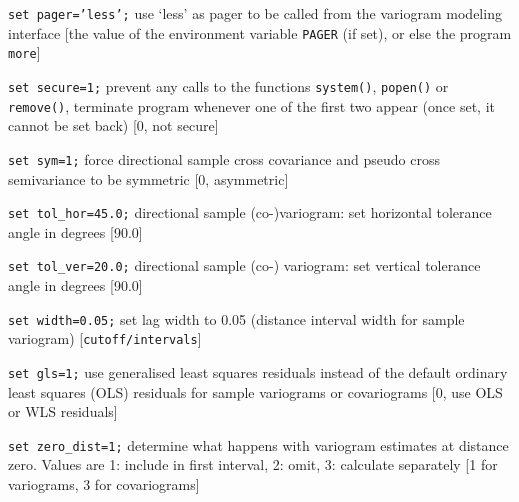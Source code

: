 \documentclass[a4paper,12pt]{book}
\makeatletter
\newcommand{\code}[1]{\texttt{#1}}
\newcommand{\thekey}[1]{\code{{#1}}\label{key:#1}\index{#1@\code{#1}}}
\newcommand{\theXkey}[2]{\code{{#1}}\label{key:#2}\index{#2@\code{#1}}}
\newenvironment{codelist}{%
\begin{description}\setlength{\labelsep}{0.5cm}}{%
\end{description}}
\makeatother
\begin{document}
\begin{codelist}

\item[\code{set \thekey{pager}='less';}]
use `less' as pager to be called from the variogram modeling interface
[the value of the environment variable {\tt PAGER} (if set), or else
the program {\tt more}]

\item[\code{set \thekey{secure}=1;}]
prevent any calls to the functions {\tt system()}, {\tt popen()} or
{\tt remove()}, terminate program whenever one of the first two appear
(once set, it cannot be set back) [0, not secure]

\item[\code{set \thekey{sym}=1;}]
force directional sample cross covariance and pseudo cross semivariance
to be symmetric [0, asymmetric]

\item[\code{set \theXkey{tol\_hor}{tolXhor}=45.0;}]
directional sample (co-)variogram: set horizontal tolerance angle in
degrees [90.0]

\item[\code{set \theXkey{tol\_ver}{tolXver}=20.0;}]
directional sample (co-) variogram: set vertical tolerance angle in
degrees [90.0]

\item[\code{set \thekey{width}=0.05;}]
\index{variogram!interval \code{width}}
set lag width to 0.05 (distance interval width for sample variogram)
[{\tt cutoff/intervals}]

\item[\code{set \thekey{gls}=1;}]
use generalised least squares residuals instead of the default ordinary
least squares (OLS) residuals for sample variograms or covariograms [0,
use OLS or WLS residuals]

\item[\code{set \theXkey{zero\_dist}{zeroXdist}=1;}]
determine what happens with variogram estimates at distance zero. Values
are 1: include in first interval, 2: omit, 3: calculate separately
[1 for variograms, 3 for covariograms]

\end{codelist}
\end{document}
